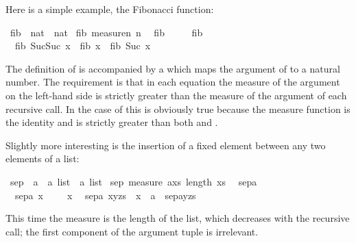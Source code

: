 %
\begin{isabellebody}%
\def\isabellecontext{examples}%
%
\begin{isamarkuptext}%
Here is a simple example, the Fibonacci function:%
\end{isamarkuptext}%
\ fib\ {\isacharcolon}{\isacharcolon}\ {\isachardoublequote}nat\ {\isasymRightarrow}\ nat{\isachardoublequote}\isanewline
{}\ fib\ {\isachardoublequote}measure{\isacharparenleft}{\isasymlambda}n{\isachardot}\ n{\isacharparenright}{\isachardoublequote}\isanewline
\ \ {\isachardoublequote}fib\ {}\ {\isacharequal}\ {}{\isachardoublequote}\isanewline
\ \ {\isachardoublequote}fib\ {}\ {\isacharequal}\ {}{\isachardoublequote}\isanewline
\ \ {\isachardoublequote}fib\ {\isacharparenleft}Suc{\isacharparenleft}Suc\ x{\isacharparenright}{\isacharparenright}\ {\isacharequal}\ fib\ x\ {\isacharplus}\ fib\ {\isacharparenleft}Suc\ x{\isacharparenright}{\isachardoublequote}%
\begin{isamarkuptext}%
\noindent
The definition of  is accompanied by a 
 which maps the argument of  to a
natural number. The requirement is that in each equation the measure of the
argument on the left-hand side is strictly greater than the measure of the
argument of each recursive call. In the case of  this is
obviously true because the measure function is the identity and
 is strictly greater than both  and
.

Slightly more interesting is the insertion of a fixed element
between any two elements of a list:%
\end{isamarkuptext}%
\ sep\ {\isacharcolon}{\isacharcolon}\ {\isachardoublequote}{\isacharprime}a\ {\isasymtimes}\ {\isacharprime}a\ list\ {\isasymRightarrow}\ {\isacharprime}a\ list{\isachardoublequote}\isanewline
{}\ sep\ {\isachardoublequote}measure\ {\isacharparenleft}{\isasymlambda}{\isacharparenleft}a{\isacharcomma}xs{\isacharparenright}{\isachardot}\ length\ xs{\isacharparenright}{\isachardoublequote}\isanewline
\ \ {\isachardoublequote}sep{\isacharparenleft}a{\isacharcomma}\ {\isacharbrackleft}{\isacharbrackright}{\isacharparenright}\ \ \ \ \ {\isacharequal}\ {\isacharbrackleft}{\isacharbrackright}{\isachardoublequote}\isanewline
\ \ {\isachardoublequote}sep{\isacharparenleft}a{\isacharcomma}\ {\isacharbrackleft}x{\isacharbrackright}{\isacharparenright}\ \ \ \ {\isacharequal}\ {\isacharbrackleft}x{\isacharbrackright}{\isachardoublequote}\isanewline
\ \ {\isachardoublequote}sep{\isacharparenleft}a{\isacharcomma}\ x{\isacharhash}y{\isacharhash}zs{\isacharparenright}\ {\isacharequal}\ x\ {\isacharhash}\ a\ {\isacharhash}\ sep{\isacharparenleft}a{\isacharcomma}y{\isacharhash}zs{\isacharparenright}{\isachardoublequote}%
\begin{isamarkuptext}%
\noindent
This time the measure is the length of the list, which decreases with the
recursive call; the first component of the argument tuple is irrelevant.


\end{isamarkuptext}
\end{isabellebody}
